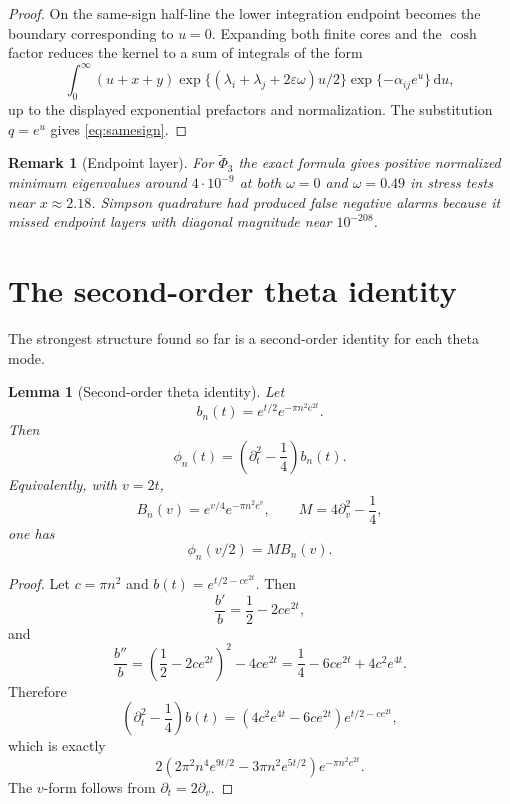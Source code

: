 \documentclass[11pt]{article}
\newtheorem{lemma}[theorem]{Lemma}
\newtheorem{remark}[theorem]{Remark}
\newcommand{\eps}{\varepsilon}
\newcommand{\dd}{\,\mathrm d}
\begin{document}
\begin{proof}
On the same-sign half-line the lower integration endpoint becomes the boundary
corresponding to $u=0$.  Expanding both finite cores and the $\cosh$ factor
reduces the kernel to a sum of integrals of the form
\[
  \int_0^\infty (u+x+y)
  \exp\{(\lambda_i+\lambda_j+2\eps\omega)u/2\}
  \exp\{-\alpha_{ij}e^u\}\dd u,
\]
up to the displayed exponential prefactors and normalization.  The substitution
$q=e^u$ gives \eqref{eq:samesign}.
\end{proof}

\begin{remark}[Endpoint layer]
For $\widetilde\Phi_3$ the exact formula gives positive normalized minimum
eigenvalues around $4\cdot 10^{-9}$ at both $\omega=0$ and $\omega=0.49$ in
stress tests near $x\approx 2.18$.  Simpson quadrature had produced false
negative alarms because it missed endpoint layers with diagonal magnitude near
$10^{-208}$.
\end{remark}

\section{The second-order theta identity}

The strongest structure found so far is a second-order identity for each theta
mode.

\begin{lemma}[Second-order theta identity]
Let
\[
   b_n(t)=e^{t/2}e^{-\pi n^2e^{2t}}.
\]
Then
\begin{equation}
   \phi_n(t)=\left(\partial_t^2-\frac14\right)b_n(t).
   \label{eq:secondorder-t}
\end{equation}
Equivalently, with $v=2t$,
\[
   B_n(v)=e^{v/4}e^{-\pi n^2e^v},\qquad
   M=4\partial_v^2-\frac14,
\]
one has
\begin{equation}
   \phi_n(v/2)=MB_n(v).
   \label{eq:secondorder-v}
\end{equation}
\end{lemma}

\begin{proof}
Let $c=\pi n^2$ and $b(t)=e^{t/2-ce^{2t}}$.  Then
\[
  \frac{b'}b=\frac12-2ce^{2t},
\]
and
\[
  \frac{b''}b
  =
  \left(\frac12-2ce^{2t}\right)^2-4ce^{2t}
  =
  \frac14-6ce^{2t}+4c^2e^{4t}.
\]
Therefore
\[
  \left(\partial_t^2-\frac14\right)b(t)
  =
  (4c^2e^{4t}-6ce^{2t})e^{t/2-ce^{2t}},
\]
which is exactly
\[
  2(2\pi^2 n^4e^{9t/2}-3\pi n^2e^{5t/2})
  e^{-\pi n^2e^{2t}}.
\]
The $v$-form follows from $\partial_t=2\partial_v$.
\end{proof}
\end{document}
